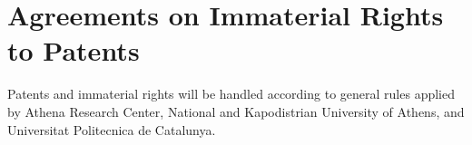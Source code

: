\documentclass[12pt]{article}
\begin{document}




\section{Agreements on Immaterial Rights to Patents}

Patents and immaterial rights will be handled according to general rules applied by Athena Research Center, National and Kapodistrian University of Athens, and Universitat Politecnica de Catalunya.


\end{document}
